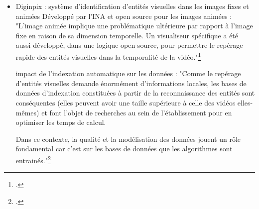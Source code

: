 \begin{itemize}
	au lieu de transférer les fichiers vers un service externe, l'algorithme doit être déployé localement au sein même de l'ifrastructure de l'archive. 
	
	exemple de l'architecture DANE au sein du projet CLARIAH : l'architecture est divisée en plusieurs "workers" et une file d'attente. si l'un des workers s'arrête de fonctionner, les autres continuent leur tâche. 
	Cette architecture produit deux types de données : des métadonnées structurées directement epxloitables, et des vecteurs de caractéristiques (= représentations abstraites des données utilisables pour des requêtes de similarité : ouvre des possibilité de recherche par ressemblance son et vidéo.)
	\footcite{noord2021}
	
	"there is a near-linear relationship between quality of transcriptions and search performance.» : importance de la qualité de la transcription audiovisuelle pour améliorer la recherche.
	\footcite{noord2021}
	
	"the application of AVP tools to large image datasets significantly scales up the level of analysis from ‘close’ to ‘distant’ viewing, allowing scholars to observe patterns in the data that are invisible in the traditional, interpretative analyses of small sample sets.» 
	le distant viewing permet de passer d'une lecture individuelle d'items à une analyse d'éléments à l'échelle d'un corpus. 
	\footcite{noord2021}
	
\item Diginpix : système d'identification d'entités visuelles dans les images fixes et animées 
Développé par l'INA et open source 
pour les images animées : "L’image animée implique une problématique ultérieure par rapport à l’image fixe en raison de sa dimension temporelle. Un visualiseur spécifique a été aussi développé, dans une logique open source, pour permettre le repérage rapide des entités visuelles dans la temporalité de la vidéo."\footcite{moiraghi2018}

impact de l'indexation automatique sur les données :
"Comme le repérage d’entités visuelles demande énormément d’informations locales, les bases de données d’indexation constituées à partir de la reconnaissance des entités sont conséquentes (elles peuvent avoir une taille supérieure à celle des vidéos elles-mêmes) et font l’objet de recherches au sein de l’établissement pour en optimiser les temps de calcul.

Dans ce contexte, la qualité et la modélisation des données jouent un rôle fondamental car c’est sur les bases de données que les algorithmes sont entrainés."\footcite{moiraghi2018}
	

\end{itemize}
